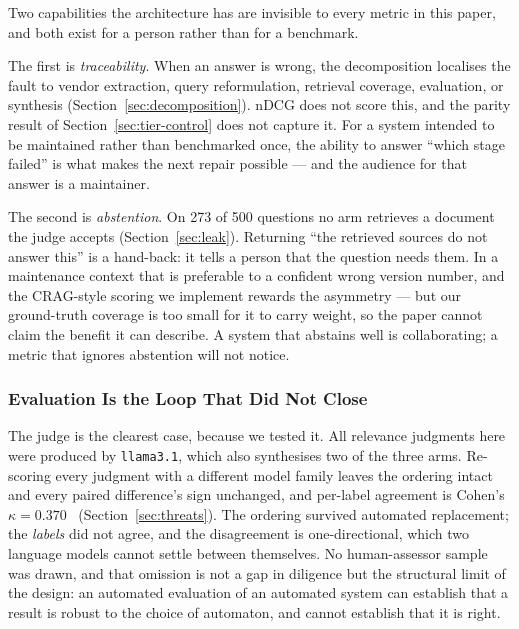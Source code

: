 \documentclass[acmsmall,review,anonymous,screen]{acmart}
\begin{document}
Two capabilities the architecture has are invisible to every metric in this
paper, and both exist for a person rather than for a benchmark.

The first is \emph{traceability}. When an answer is wrong, the decomposition
localises the fault to vendor extraction, query reformulation, retrieval
coverage, evaluation, or synthesis (Section~\ref{sec:decomposition}). nDCG does
not score this, and the parity result of Section~\ref{sec:tier-control} does not
capture it. For a system intended to be maintained rather than benchmarked once,
the ability to answer ``which stage failed'' is what makes the next repair
possible --- and the audience for that answer is a maintainer.

The second is \emph{abstention}. On 273 of 500 questions no arm retrieves a
document the judge accepts (Section~\ref{sec:leak}). Returning ``the retrieved
sources do not answer this'' is a hand-back: it tells a person that the
question needs them. In a maintenance context that is preferable to a confident
wrong version number, and the CRAG-style scoring we implement rewards the
asymmetry --- but our ground-truth coverage is too small for it to carry weight,
so the paper cannot claim the benefit it can describe. A system that abstains
well is collaborating; a metric that ignores abstention will not notice.

\subsubsection{Evaluation Is the Loop That Did Not Close}

The judge is the clearest case, because we tested it. All relevance judgments
here were produced by \texttt{llama3.1}, which also synthesises two of the three
arms. Re-scoring every judgment with a different model family leaves the
ordering intact and every paired difference's sign unchanged, and per-label
agreement is Cohen's $\kappa=0.370$~\cite{cohen1960coefficient}
(Section~\ref{sec:threats}). The ordering survived
automated replacement; the \emph{labels} did not agree, and the disagreement is
one-directional, which two language models cannot settle between themselves. No
human-assessor sample was drawn, and that omission is not a gap in diligence but
the structural limit of the design: an automated evaluation of an automated
system can establish that a result is robust to the choice of automaton, and
cannot establish that it is right.
\end{document}
